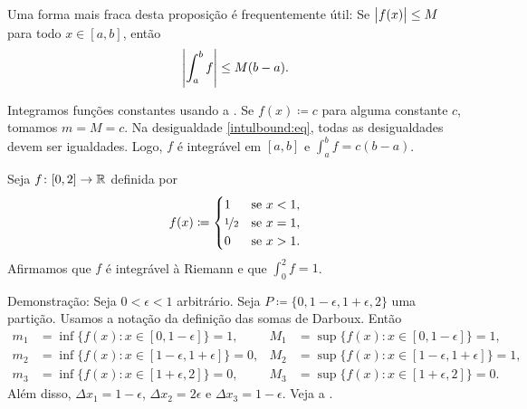 Uma forma mais fraca desta proposição é frequentemente útil:
Se $\bigl\lvert {f(x)} \bigr\rvert \leq M$ para todo $x \in [a,b]$, então
\begin{equation*}
\left\lvert {\int_a^b f} \right\rvert \leq M(b-a) .
\end{equation*}

\begin{example}
Integramos funções constantes usando a
.
Se $f(x) \coloneqq c$ para alguma constante $c$, tomamos $m = M = c$.
Na desigualdade \eqref{intulbound:eq},
todas as desigualdades devem ser igualdades.
Logo, $f$ é integrável em $[a,b]$ e $\int_a^b f = c(b-a)$.
\end{example}

\begin{example}
Seja $f \colon [0,2] \to {\mathbb{R}}$ definida por
\begin{equation*}
f(x) \coloneqq
\begin{cases}
1               & \text{se } x < 1,\\
\nicefrac{1}{2} & \text{se } x = 1,\\
0               & \text{se } x > 1.
\end{cases}
\end{equation*}
Afirmamos que $f$ é integrável à Riemann e que $\int_0^2 f = 1$.

Demonstração: Seja $0 < \epsilon < 1$ arbitrário.
Seja $P \coloneqq \{0, 1-\epsilon, 1+\epsilon, 2\}$ uma partição. Usamos a
notação da definição das somas de Darboux. Então
\begin{align*}
m_1 &= \inf  \bigl\{ f(x) : x \in [0,1-\epsilon] \bigr\} = 1 , & 
M_1 &= \sup  \bigl\{ f(x) : x \in [0,1-\epsilon] \bigr\} = 1 , \\
m_2 &= \inf  \bigl\{ f(x) : x \in [1-\epsilon,1+\epsilon] \bigr\} = 0 , & 
M_2 &= \sup  \bigl\{ f(x) : x \in [1-\epsilon,1+\epsilon] \bigr\} = 1 , \\
m_3 &= \inf  \bigl\{ f(x) : x \in [1+\epsilon,2] \bigr\} = 0 , & 
M_3 &= \sup  \bigl\{ f(x) : x \in [1+\epsilon,2] \bigr\} = 0 .
\end{align*}
Além disso, $\Delta x_1 = 1-\epsilon$, $\Delta x_2 = 2\epsilon$ e
$\Delta x_3 = 1-\epsilon$.
Veja a .
\begin{myfigureht}
\caption{Somas de Darboux para a função em degraus. $L(P,f)$ é a área do
retângulo sombreado, $U(P,f)$ é a área dos dois retângulos, e
$U(P,f)-L(P,f)$ é a área do retângulo não sombreado.\label{darbouxfigstep}}
\end{myfigureht}


\end{example}
